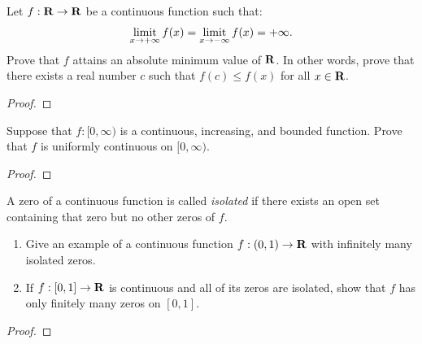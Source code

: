 \documentclass[11pt,twoside,openany]{memoir}
\begin{document}
\newpage
\fancyhead[L]{\scalebox{0.9}{Continuity}}
\fancyhead[R]{\scalebox{0.9}{Appeared on: F15}}
\begin{problem}
    Let $f:\mathbf{R} \rightarrow \mathbf{R}$ be a continuous function such that:
        \begin{equation*}
        \begin{split}
            \operatorname*{limit}_{x \rightarrow +\infty}f(x) = \operatorname*{limit}_{x \rightarrow -\infty}f(x) = +\infty.
        \end{split}
        \end{equation*}
    Prove that $f$ attains an absolute minimum value of $\mathbf{R}$. In other words, prove that there exists a real number $c$ such that $f(c) \leq f(x)$ for all $x \in \mathbf{R}$.
\end{problem}
\begin{proof}
\end{proof}

\newpage
\fancyhead[L]{\scalebox{0.9}{Continuity}}
\fancyhead[R]{\scalebox{0.9}{Appeared on: W25}}
\begin{problem}
    Suppose that $f:[0,\infty)$ is a continuous, increasing, and bounded function. Prove that $f$ is uniformly continuous on $[0,\infty)$.
\end{problem}
\begin{proof}
\end{proof}

\newpage
\fancyhead[L]{\scalebox{0.9}{Continuity}}
\fancyhead[R]{\scalebox{0.9}{Appeared on: W24}}
\begin{problem}
    A zero of a continuous function is called \textit{isolated} if there exists an open set containing that zero but no other zeros of $f$.
    \begin{enumerate}[label = (\arabic*)]
        \item Give an example of a continuous function $f:(0,1) \rightarrow \mathbf{R}$ with infinitely many isolated zeros.
        \item If $f:[0,1] \rightarrow \mathbf{R}$ is continuous and all of its zeros are isolated, show that $f$ has only finitely many zeros on $[0,1]$.
    \end{enumerate}
\end{problem}
\begin{proof}
\end{proof}
\end{document}
